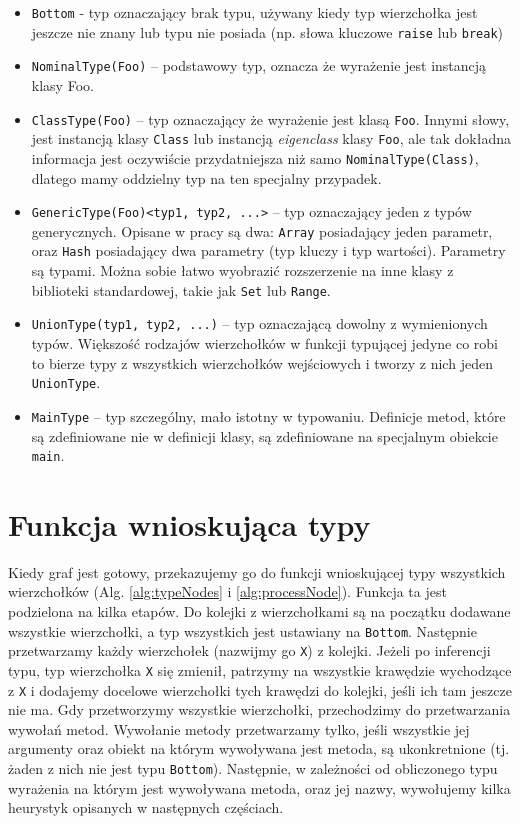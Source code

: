 \documentclass[declaration,shortabstract,mgr]{iithesis}
\begin{document}
\begin{itemize}
 \item \texttt{Bottom} - typ oznaczający brak typu, używany kiedy typ wierzchołka jest jeszcze nie znany lub typu nie posiada (np. słowa kluczowe \texttt{raise} lub \texttt{break})
 \item \texttt{NominalType(Foo)} -- podstawowy typ, oznacza że wyrażenie jest instancją klasy Foo.
 \item \texttt{ClassType(Foo)} -- typ oznaczający że wyrażenie jest klasą \texttt{Foo}. Innymi słowy, jest instancją klasy \texttt{Class} lub instancją \textit{eigenclass} klasy \texttt{Foo}, ale tak dokładna informacja jest oczywiście przydatniejsza niż samo \texttt{NominalType(Class)}, dlatego mamy oddzielny typ na ten specjalny przypadek.
 \item \texttt{GenericType(Foo)<typ1, typ2, ...>} -- typ oznaczający jeden z typów generycznych. Opisane w pracy są dwa: \texttt{Array} posiadający jeden parametr, oraz \texttt{Hash} posiadający dwa parametry (typ kluczy i typ wartości). Parametry są typami. Można sobie łatwo wyobrazić rozszerzenie na inne klasy z biblioteki standardowej, takie jak \texttt{Set} lub \texttt{Range}.
 \item \texttt{UnionType(typ1, typ2, ...)} -- typ oznaczającą dowolny z wymienionych typów. Większość rodzajów wierzchołków w funkcji typującej jedyne co robi to bierze typy z wszystkich wierzchołków wejściowych i tworzy z nich jeden \texttt{UnionType}.
 \item \texttt{MainType} -- typ szczególny, mało istotny w typowaniu. Definicje metod, które są zdefiniowane nie w definicji klasy, są zdefiniowane na specjalnym obiekcie \texttt{main}.
\end{itemize}



\section{Funkcja wnioskująca typy}

Kiedy graf jest gotowy, przekazujemy go do funkcji wnioskującej typy wszystkich wierzchołków (Alg. \ref{alg:typeNodes} i \ref{alg:processNode}). Funkcja ta jest podzielona na kilka etapów.
Do kolejki z wierzchołkami są na początku dodawane wszystkie wierzchołki, a typ wszystkich jest ustawiany na \texttt{Bottom}.
Następnie przetwarzamy każdy wierzchołek (nazwijmy go \texttt{X}) z kolejki.
Jeżeli po inferencji typu, typ wierzchołka \texttt{X} się zmienił, patrzymy na wszystkie krawędzie wychodzące z \texttt{X} i dodajemy docelowe wierzchołki tych krawędzi do kolejki, jeśli ich tam jeszcze nie ma.
Gdy przetworzymy wszystkie wierzchołki, przechodzimy do przetwarzania wywołań metod.
Wywołanie metody przetwarzamy tylko, jeśli wszystkie jej argumenty oraz obiekt na którym wywoływana jest metoda, są ukonkretnione (tj. żaden z nich nie jest typu \texttt{Bottom}).
Następnie, w zależności od obliczonego typu wyrażenia na którym jest wywoływana metoda, oraz jej nazwy, wywołujemy kilka heurystyk opisanych w następnych częściach.
\end{document}
